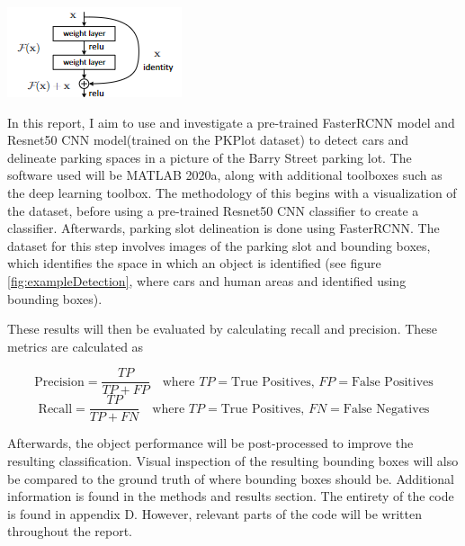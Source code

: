 \documentclass[man]{apa7}
\begin{document}
\begin{minipage}{\linewidth}
  \includegraphics[height=\textheight/6 ,width=\textwidth/4]{figures/resnet.png}
  \label{fig:resnet50}
\end{minipage}

\newpage

In this report, I aim to use and investigate a pre-trained FasterRCNN model and Resnet50 CNN model(trained on the PKPlot dataset) to detect cars and delineate parking spaces in a picture of the Barry Street parking lot. The software used will be MATLAB 2020a, along with additional toolboxes such as the deep learning toolbox. The methodology of this begins with a visualization of the dataset, before using a pre-trained Resnet50 CNN classifier to create a classifier. Afterwards, parking slot delineation is done using FasterRCNN. The dataset for this step involves images of the parking slot and bounding boxes, which identifies the space in which an object is identified (see figure \ref{fig:exampleDetection}, where cars and human areas and identified using bounding boxes).

These results will then be evaluated by calculating recall and precision. These metrics are calculated as 

\[
\text{Precision} = \frac{TP}{TP + FP} \quad \text{where } TP = \text{True Positives, } FP = \text{False Positives}
\]
\[
\text{Recall} = \frac{TP}{TP + FN} \quad \text{where } TP = \text{True Positives, } FN = \text{False Negatives}
\]

Afterwards, the object performance will be post-processed to improve the resulting classification. Visual inspection of the resulting bounding boxes will also be compared to the ground truth of where bounding boxes should be. Additional information is found in the methods and results section. The entirety of the code is found in appendix D. However, relevant parts of the code will be written throughout the report.
\end{document}
